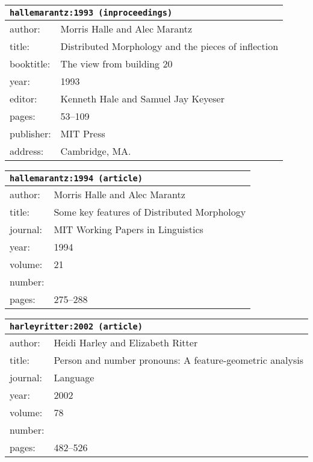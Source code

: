 \documentclass{article}
\begin{document}
\bigskip

\begin{tabular}{p{}p{}}
\multicolumn{2}{l}{\texttt{hallemarantz:1993 (inproceedings)}}\\
\hline
author: & Morris Halle and Alec Marantz\\
title: & Distributed Morphology and the pieces of inflection\\
booktitle: & The view from building 20\\
year: & 1993\\
editor: & Kenneth Hale and Samuel Jay Keyeser\\
pages: & 53--109\\
publisher: & MIT Press\\
address: & Cambridge, MA.\\
\end{tabular}

\bigskip

\begin{tabular}{p{}p{}}
\multicolumn{2}{l}{\texttt{hallemarantz:1994 (article)}}\\
\hline
author: & Morris Halle and Alec Marantz\\
title: & Some key features of Distributed Morphology\\
journal: & MIT Working Papers in Linguistics\\
year: & 1994\\
volume: & 21\\
number: & \\
pages: & 275--288\\
\end{tabular}

\bigskip

\begin{tabular}{p{}p{}}
\multicolumn{2}{l}{\texttt{harleyritter:2002 (article)}}\\
\hline
author: & Heidi Harley and Elizabeth Ritter\\
title: & Person and number pronouns: A feature-geometric analysis\\
journal: & Language\\
year: & 2002\\
volume: & 78\\
number: & \\
pages: & 482--526\\
\end{tabular}

\bigskip
\end{document}
